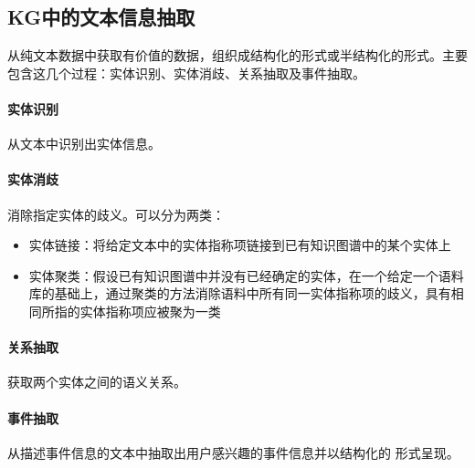 \subsection{KG中的文本信息抽取}
从纯文本数据中获取有价值的数据，组织成结构化的形式或半结构化的形式。主要包含这几个过程：实体识别、实体消歧、关系抽取及事件抽取。
\paragraph{实体识别}从文本中识别出实体信息。

\paragraph{实体消歧}消除指定实体的歧义。可以分为两类：
\begin{itemize}
	\item 实体链接：将给定文本中的实体指称项链接到已有知识图谱中的某个实体上
	\item 实体聚类：假设已有知识图谱中并没有已经确定的实体，在一个给定一个语料库的基础上，通过聚类的方法消除语料中所有同一实体指称项的歧义，具有相同所指的实体指称项应被聚为一类
\end{itemize}

\paragraph{关系抽取}获取两个实体之间的语义关系。

\paragraph{事件抽取}从描述事件信息的文本中抽取出用户感兴趣的事件信息并以结构化的
形式呈现。
